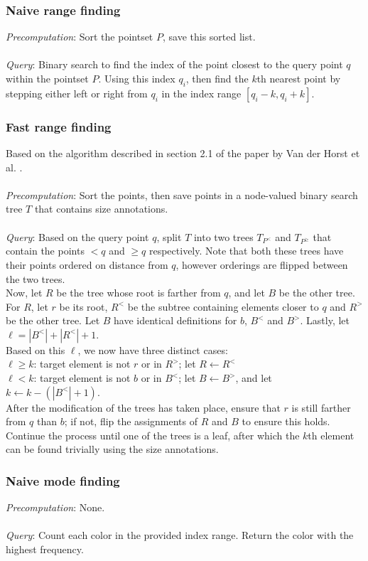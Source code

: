 \documentclass{article}
\begin{document}
\subsubsection{Naive range finding}
\textit{Precomputation}: Sort the pointset $P$, save this sorted list. \\\\
\textit{Query}: Binary search to find the index of the point closest to the query point $q$ within the pointset $P$. Using this index $q_i$, then find the $k$th nearest point by stepping either left or right from $q_i$ in the index range $[q_i-k, q_i+k]$.
\subsubsection{Fast range finding}
Based on the algorithm described in section 2.1 of the paper by Van der Horst
et al. \cite{Chan2014}. \\\\ \textit{Precomputation}: Sort the points, then
save points in a node-valued binary search tree $T$ that contains size
annotations. \\\\ \textit{Query}: Based on the query point $q$, split $T$ into
two trees $T_{P^<}$ and $T_{P^{\geq}}$ that contain the points $< q$ and $\geq
    q$ respectively. Note that both these trees have their points ordered on
distance from $q$, however orderings are flipped between the two trees. \\ Now,
let $R$ be the tree whose root is farther from $q$, and let $B$ be the other
tree. For $R$, let $r$ be its root, $R^<$ be the subtree containing elements
closer to $q$ and $R^>$ be the other tree. Let $B$ have identical definitions
for $b$, $B^<$ and $B^>$. Lastly, let $\ell = |B^<| + |R^<| + 1$. \\ Based on
this $\ell$, we now have three distinct cases: \\ $\ell \geq k$: target element
is not $r$ or in $R^>$; let $R \leftarrow R^<$\\ $\ell < k$: target element is
not $b$ or in $B^<$; let $B \leftarrow B^>$, and let $k \leftarrow k - (|B^<| +
    1)$. \\ After the modification of the trees has taken place, ensure that $r$ is
still farther from $q$ than $b$; if not, flip the assignments of $R$ and $B$ to
ensure this holds. Continue the process until one of the trees is a leaf, after
which the $k$th element can be found trivially using the size annotations.
\subsubsection{Naive mode finding}
\textit{Precomputation}: None. \\\\
\textit{Query}: Count each color in the provided index range. Return the color with the highest frequency.
\end{document}
